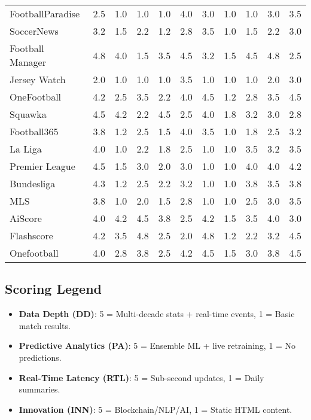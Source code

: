 \begin{table}[h!]
\begin{tabular}{|l|c|c|c|c|c|c|c|c|c|c|}
        FootballParadise & 2.5 & 1.0 & 1.0 & 1.0 & 4.0 & 3.0 & 1.0 & 1.0 & 3.0 & 3.5 \\
        SoccerNews & 3.2 & 1.5 & 2.2 & 1.2 & 2.8 & 3.5 & 1.0 & 1.5 & 2.2 & 3.0 \\
        Football Manager & 4.8 & 4.0 & 1.5 & 3.5 & 4.5 & 3.2 & 1.5 & 4.5 & 4.8 & 2.5 \\
        Jersey Watch & 2.0 & 1.0 & 1.0 & 1.0 & 3.5 & 1.0 & 1.0 & 1.0 & 2.0 & 3.0 \\
        OneFootball & 4.2 & 2.5 & 3.5 & 2.2 & 4.0 & 4.5 & 1.2 & 2.8 & 3.5 & 4.5 \\
        Squawka & 4.5 & 4.2 & 2.2 & 4.5 & 2.5 & 4.0 & 1.8 & 3.2 & 3.0 & 2.8 \\
        Football365 & 3.8 & 1.2 & 2.5 & 1.5 & 4.0 & 3.5 & 1.0 & 1.8 & 2.5 & 3.2 \\
        La Liga & 4.0 & 1.0 & 2.2 & 1.8 & 2.5 & 1.0 & 1.0 & 3.5 & 3.2 & 3.5 \\
        Premier League & 4.5 & 1.5 & 3.0 & 2.0 & 3.0 & 1.0 & 1.0 & 4.0 & 4.0 & 4.2 \\
        Bundesliga & 4.3 & 1.2 & 2.5 & 2.2 & 3.2 & 1.0 & 1.0 & 3.8 & 3.5 & 3.8 \\
        MLS & 3.8 & 1.0 & 2.0 & 1.5 & 2.8 & 1.0 & 1.0 & 2.5 & 3.0 & 3.5 \\
        AiScore & 4.0 & 4.2 & 4.5 & 3.8 & 2.5 & 4.2 & 1.5 & 3.5 & 4.0 & 3.0 \\
        Flashscore & 4.2 & 3.5 & 4.8 & 2.5 & 2.0 & 4.8 & 1.2 & 2.2 & 3.2 & 4.5 \\
        Onefootball & 4.0 & 2.8 & 3.8 & 2.5 & 4.2 & 4.5 & 1.5 & 3.0 & 3.8 & 4.5 \\
        \hline
    \end{tabular}
\end{table}

\subsection{Scoring Legend}
\begin{itemize}
    \item \textbf{Data Depth (DD)}: 5 = Multi-decade stats + real-time events, 1 = Basic match results.
    \item \textbf{Predictive Analytics (PA)}: 5 = Ensemble ML + live retraining, 1 = No predictions.
    \item \textbf{Real-Time Latency (RTL)}: 5 = Sub-second updates, 1 = Daily summaries.
    \item \textbf{Innovation (INN)}: 5 = Blockchain/NLP/AI, 1 = Static HTML content.
\end{itemize}

